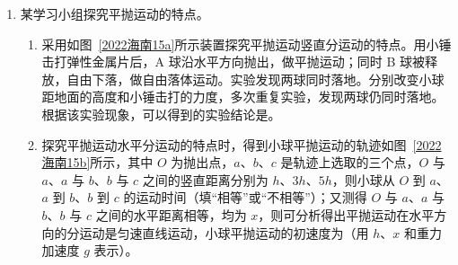 \documentclass[\gkver]{gaokaozhenti}
\begin{document}
\begin{enumerate}
{	故选 A。

	（2）第 1 条亮纹到第 6 条亮纹间距是 $x$，则相邻亮条纹间距为

	$\Delta x = \frac{x}{5}$

	根据 $\Delta x = \frac{L\lambda}{d}$ 可得光的波长是

	$\lambda = \frac{\Delta x d}{L} = \frac{dx}{5L}$
}

\item
某学习小组探究平抛运动的特点。

\begin{enumerate}
	\item
	采用如图~\ref{2022海南15a}所示装置探究平抛运动竖直分运动的特点。用小锤击打弹性金属片后，A 球沿水平方向抛出，做平抛运动；同时 B 球被释放，自由下落，做自由落体运动。实验发现两球同时落地。分别改变小球距地面的高度和小锤击打的力度，多次重复实验，发现两球仍同时落地。根据该实验现象，可以得到的实验结论是。
	\item
	探究平抛运动水平分运动的特点时，得到小球平抛运动的轨迹如图~\ref{2022海南15b}所示，其中 $O$ 为抛出点，$a$、$b$、$c$ 是轨迹上选取的三个点，$O$ 与 $a$、$a$ 与 $b$、$b$ 与 $c$ 之间的竖直距离分别为 $h$、$3h$、$5h$，则小球从 $O$ 到 $a$、$a$ 到 $b$、$b$ 到 $c$ 的运动时间（填“相等”或“不相等”）；又测得 $O$ 与 $a$、$a$ 与 $b$、$b$ 与 $c$ 之间的水平距离相等，均为 $x$，则可分析得出平抛运动在水平方向的分运动是匀速直线运动，小球平抛运动的初速度为（用 $h$、$x$ 和重力加速度 $g$ 表示）。
\end{enumerate}


\end{enumerate}
\end{document}
